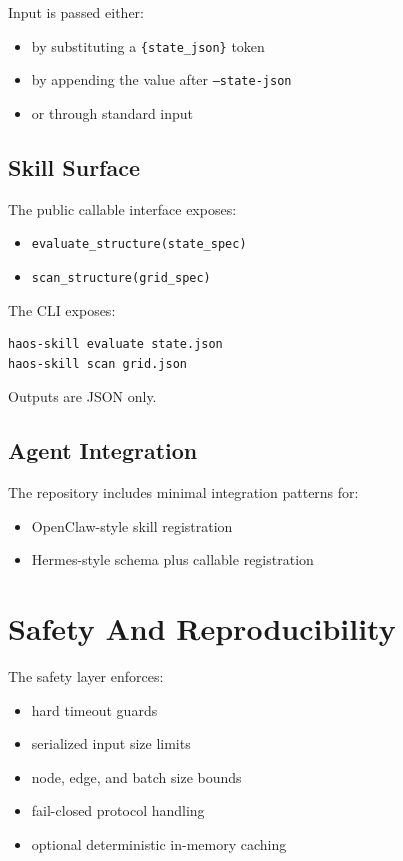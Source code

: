 \documentclass[11pt]{article}
\begin{document}
Input is passed either:

\begin{itemize}
\item by substituting a \texttt{\{state\_json\}} token
\item by appending the value after \texttt{--state-json}
\item or through standard input
\end{itemize}

\subsection{Skill Surface}

The public callable interface exposes:

\begin{itemize}
\item \texttt{evaluate\_structure(state\_spec)}
\item \texttt{scan\_structure(grid\_spec)}
\end{itemize}

The CLI exposes:

\begin{verbatim}
haos-skill evaluate state.json
haos-skill scan grid.json
\end{verbatim}

Outputs are JSON only.

\subsection{Agent Integration}

The repository includes minimal integration patterns for:

\begin{itemize}
\item OpenClaw-style skill registration
\item Hermes-style schema plus callable registration
\end{itemize}

\section{Safety And Reproducibility}

The safety layer enforces:

\begin{itemize}
\item hard timeout guards
\item serialized input size limits
\item node, edge, and batch size bounds
\item fail-closed protocol handling
\item optional deterministic in-memory caching
\end{itemize}
\end{document}
